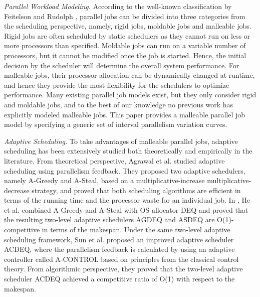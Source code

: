 \documentclass[10pt, a4paper]{article}
\begin{document}
\emph{Parallel Workload Modeling.} According to the well-known classification by Feitelson and
Rudolph \cite{FeitelsonRu98}, parallel jobs can be divided into three categories from the
scheduling perspective, namely, rigid jobs, moldable jobs and malleable jobs. Rigid jobs are often
scheduled by static schedulers as they cannot run on less or more processors than specified.
Moldable jobs can run on a variable number of processors, but it cannot be modified once the job is
started. Hence, the initial decision by the scheduler will determine the overall system
performance. For malleable jobs, their processor allocation can be dynamically changed at runtime,
and hence they provide the most flexibility for the schedulers to optimize performance. Many
existing parallel job models \cite{Downey98, JannPaFr97, CirneBe01, LublinFe03} exist, but they
only consider rigid and moldable jobs, and to the best of our knowledge no previous work has
explicitly modeled malleable jobs. This paper provides a malleable parallel job model by specifying
a generic set of interval parallelism variation curves.

\emph{Adaptive Scheduling.}  To take advantages of malleable parallel jobs, adaptive scheduling has
been extensively studied both theoretically and empirically in the literature. From theoretical
perspective, Agrawal et al. \cite{AgrawalHeHs06,AgrawalLeHe08} studied adaptive scheduling using
parallelism feedback. They proposed two adaptive schedulers, namely A-Greedy and A-Steal, based on
a multiplicative-increase multiplicative-decrease strategy, and proved that both scheduling
algorithms are efficient in terms of the running time and the processor waste for an individual
job. In \cite{HeHsLe08}, He et al. combined A-Greedy and A-Steal with OS allocator DEQ
\cite{McCannVaZa93} and proved that the resulting two-level adaptive schedulers AGDEQ and ASDEQ are
O(1)-competitive in terms of the makespan. Under the same two-level adaptive scheduling framework,
Sun et al. \cite{SunCaHs11} proposed an improved adaptive scheduler ACDEQ, where the parallelism
feedback is calculated by using an adaptive controller called A-CONTROL based on principles from
the classical control theory. From algorithmic perspective, they proved that the two-level adaptive
scheduler ACDEQ achieved a competitive ratio of O(1) with respect to the makespan.
\end{document}
